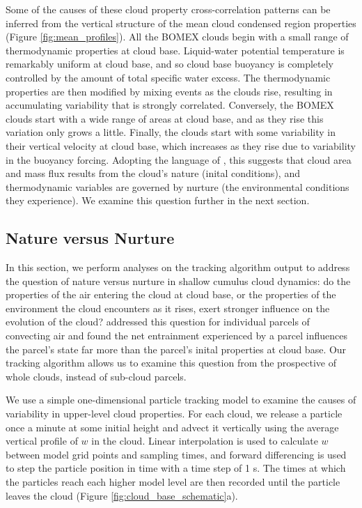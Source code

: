 \documentclass[acp]{copernicus}
\begin{document}
Some of the causes of these cloud property cross-correlation patterns can be 
inferred from the vertical structure of the mean cloud condensed region 
properties (Figure \ref{fig:mean_profiles}).  All the BOMEX clouds begin with 
a small range of thermodynamic properties at cloud base.  Liquid-water 
potential temperature is remarkably uniform at cloud base, and so cloud base 
buoyancy is completely controlled by the amount of total specific water excess.
The thermodynamic properties are then modified by mixing events as the clouds 
rise, resulting in accumulating variability that is strongly correlated.  
Conversely, the BOMEX clouds start with a wide range of areas at cloud base, 
and as they rise this variation only grows a little.  Finally, the clouds start 
with some variability in their vertical velocity at cloud base, which increases 
as they rise due to variability in the buoyancy forcing.  Adopting the language 
of \cite{Romps2010}, this suggests that cloud area and mass flux results from 
the cloud's nature (inital conditions), and thermodynamic variables are 
governed by nurture (the environmental conditions they experience).  We examine 
this question further in the next section.

\subsection{Nature versus Nurture}

In this section, we perform analyses on the tracking algorithm output to 
address the question of nature versus nurture in shallow cumulus cloud 
dynamics: do the properties of the air entering the cloud at cloud base, or the 
properties of the environment the cloud encounters as it rises, exert stronger 
influence on the evolution of the cloud?  \cite{Romps2010} addressed this 
question for individual parcels of convecting air and found the net entrainment 
experienced by a parcel influences the parcel's state far more than the 
parcel's inital properties at cloud base.  Our tracking algorithm allows us to 
examine this question from the prospective of whole clouds, instead of 
sub-cloud parcels.

We use a simple one-dimensional particle tracking model to examine the causes 
of variability in upper-level cloud properties.  For each cloud, we release a 
particle once a minute at some initial height and advect it vertically using 
the average vertical profile of $w$ in the cloud.  Linear interpolation is 
used to calculate $w$ between model grid points and sampling times, and forward 
differencing is used to step the particle position in time with a time step of 
1 s.  The times at which the particles reach each higher model level are then 
recorded until the particle leaves the cloud (Figure 
\ref{fig:cloud_base_schematic}a).  
\end{document}
